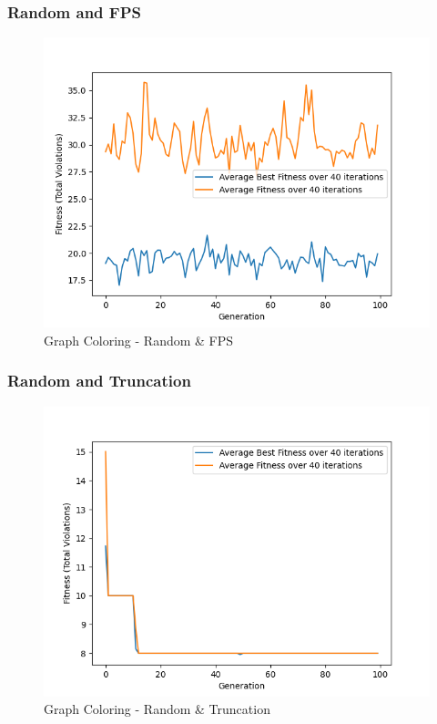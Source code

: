 \documentclass[11pt, letterpaper]{article}
\begin{document}
\subsubsection {Random and FPS}
\begin{figure}[H]
    \centering
    \includegraphics[scale = 0.6]{images/graphcoloring_rd_fp.png}
    \caption {Graph Coloring - Random \& FPS}
    \label {fig:gcRB}
\end{figure}

\subsubsection {Random and Truncation}
\begin{figure}[H]
    \centering
    \includegraphics[scale = 0.6]{images/graphcoloring_rd_tr.png}
    \caption {Graph Coloring - Random \& Truncation}
    \label {fig:gcRT}
\end{figure}
\end{document}
